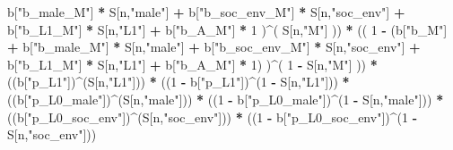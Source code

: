 \documentclass[
]{book}
\newenvironment{Shaded}{\begin{snugshade}}{\end{snugshade}}
\newcommand{\DecValTok}[1]{\textcolor[rgb]{0.00,0.00,0.81}{#1}}
\newcommand{\NormalTok}[1]{#1}
\newcommand{\SpecialCharTok}[1]{\textcolor[rgb]{0.81,0.36,0.00}{\textbf{#1}}}
\newcommand{\StringTok}[1]{\textcolor[rgb]{0.31,0.60,0.02}{#1}}
\begin{document}
\begin{Shaded}
\begin{Highlighting}[]
\NormalTok{           b[}\StringTok{"b\_male\_M"}\NormalTok{] }\SpecialCharTok{*}\NormalTok{ S[n,}\StringTok{"male"}\NormalTok{] }\SpecialCharTok{+} 
\NormalTok{           b[}\StringTok{"b\_soc\_env\_M"}\NormalTok{] }\SpecialCharTok{*}\NormalTok{ S[n,}\StringTok{"soc\_env"}\NormalTok{] }\SpecialCharTok{+} 
\NormalTok{           b[}\StringTok{"b\_L1\_M"}\NormalTok{] }\SpecialCharTok{*}\NormalTok{ S[n,}\StringTok{"L1"}\NormalTok{] }\SpecialCharTok{+}
\NormalTok{           b[}\StringTok{"b\_A\_M"}\NormalTok{] }\SpecialCharTok{*} \DecValTok{1}\NormalTok{ )}\SpecialCharTok{\^{}}\NormalTok{( S[n,}\StringTok{"M"}\NormalTok{] )) }\SpecialCharTok{*} 
\NormalTok{      (( }\DecValTok{1} \SpecialCharTok{{-}}\NormalTok{ (b[}\StringTok{"b\_M"}\NormalTok{] }\SpecialCharTok{+} 
\NormalTok{                b[}\StringTok{"b\_male\_M"}\NormalTok{] }\SpecialCharTok{*}\NormalTok{ S[n,}\StringTok{"male"}\NormalTok{] }\SpecialCharTok{+} 
\NormalTok{                b[}\StringTok{"b\_soc\_env\_M"}\NormalTok{] }\SpecialCharTok{*}\NormalTok{ S[n,}\StringTok{"soc\_env"}\NormalTok{] }\SpecialCharTok{+} 
\NormalTok{                b[}\StringTok{"b\_L1\_M"}\NormalTok{] }\SpecialCharTok{*}\NormalTok{ S[n,}\StringTok{"L1"}\NormalTok{] }\SpecialCharTok{+}
\NormalTok{                b[}\StringTok{"b\_A\_M"}\NormalTok{] }\SpecialCharTok{*} \DecValTok{1}\NormalTok{) )}\SpecialCharTok{\^{}}\NormalTok{( }\DecValTok{1} \SpecialCharTok{{-}}\NormalTok{ S[n,}\StringTok{"M"}\NormalTok{] ))  }\SpecialCharTok{*}
\NormalTok{      ((b[}\StringTok{"p\_L1"}\NormalTok{])}\SpecialCharTok{\^{}}\NormalTok{(S[n,}\StringTok{"L1"}\NormalTok{])) }\SpecialCharTok{*}
\NormalTok{      ((}\DecValTok{1} \SpecialCharTok{{-}}\NormalTok{ b[}\StringTok{"p\_L1"}\NormalTok{])}\SpecialCharTok{\^{}}\NormalTok{(}\DecValTok{1} \SpecialCharTok{{-}}\NormalTok{ S[n,}\StringTok{"L1"}\NormalTok{])) }\SpecialCharTok{*}
\NormalTok{      ((b[}\StringTok{"p\_L0\_male"}\NormalTok{])}\SpecialCharTok{\^{}}\NormalTok{(S[n,}\StringTok{"male"}\NormalTok{])) }\SpecialCharTok{*} 
\NormalTok{      ((}\DecValTok{1} \SpecialCharTok{{-}}\NormalTok{ b[}\StringTok{"p\_L0\_male"}\NormalTok{])}\SpecialCharTok{\^{}}\NormalTok{(}\DecValTok{1} \SpecialCharTok{{-}}\NormalTok{ S[n,}\StringTok{"male"}\NormalTok{])) }\SpecialCharTok{*} 
\NormalTok{      ((b[}\StringTok{"p\_L0\_soc\_env"}\NormalTok{])}\SpecialCharTok{\^{}}\NormalTok{(S[n,}\StringTok{"soc\_env"}\NormalTok{])) }\SpecialCharTok{*}
\NormalTok{      ((}\DecValTok{1} \SpecialCharTok{{-}}\NormalTok{ b[}\StringTok{"p\_L0\_soc\_env"}\NormalTok{])}\SpecialCharTok{\^{}}\NormalTok{(}\DecValTok{1} \SpecialCharTok{{-}}\NormalTok{ S[n,}\StringTok{"soc\_env"}\NormalTok{])) }
    

\end{Highlighting}
\end{Shaded}
\end{document}
